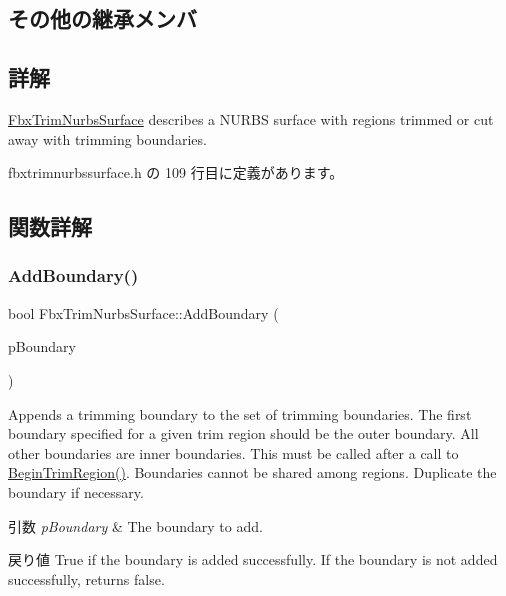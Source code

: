 \subsection*{その他の継承メンバ}


\subsection{詳解}
\hyperlink{class_fbx_trim_nurbs_surface}{Fbx\+Trim\+Nurbs\+Surface} describes a N\+U\+R\+BS surface with regions trimmed or cut away with trimming boundaries. 

 fbxtrimnurbssurface.\+h の 109 行目に定義があります。



\subsection{関数詳解}
\mbox{\label{class_fbx_trim_nurbs_surface_ab1b07cf42bbc5ac750aaed3012ebeec6}} 
\subsubsection{\texorpdfstring{Add\+Boundary()}{AddBoundary()}}
{\footnotesize\ttfamily bool Fbx\+Trim\+Nurbs\+Surface\+::\+Add\+Boundary (\begin{DoxyParamCaption}\item[{\hyperlink{class_fbx_boundary}{Fbx\+Boundary} $\ast$}]{p\+Boundary }\end{DoxyParamCaption})}

Appends a trimming boundary to the set of trimming boundaries. The first boundary specified for a given trim region should be the outer boundary. All other boundaries are inner boundaries. This must be called after a call to \hyperlink{class_fbx_trim_nurbs_surface_aaec68af89d01b7f4bd76c2ec5e3eb837}{Begin\+Trim\+Region()}. Boundaries cannot be shared among regions. Duplicate the boundary if necessary. 
\begin{DoxyParams}{引数}
{\em p\+Boundary} & The boundary to add. \\
\hline
\end{DoxyParams}
\begin{DoxyReturn}{戻り値}
{\ttfamily True} if the boundary is added successfully. If the boundary is not added successfully, returns {\ttfamily false}. 
\end{DoxyReturn}
\mbox{\label{class_fbx_trim_nurbs_surface_aaec68af89d01b7f4bd76c2ec5e3eb837}} 
